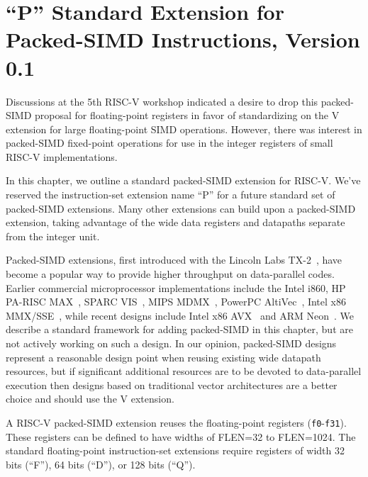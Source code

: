 \chapter{``P'' Standard Extension for Packed-SIMD Instructions,
  Version 0.1}
\label{sec:packedsimd}

\begin{commentary}
  Discussions at the 5th RISC-V workshop indicated a desire to drop
  this packed-SIMD proposal for floating-point registers in favor of
  standardizing on the V extension for large floating-point SIMD
  operations.  However, there was interest in packed-SIMD fixed-point
  operations for use in the integer registers of small RISC-V
  implementations.
\end{commentary}

In this chapter, we outline a standard packed-SIMD extension for
RISC-V.  We've reserved the instruction-set extension name ``P'' for a future
standard set of packed-SIMD extensions.  Many other extensions can
build upon a packed-SIMD extension, taking advantage of the wide data
registers and datapaths separate from the integer unit.

\begin{commentary}
Packed-SIMD extensions, first introduced with the Lincoln Labs TX-2~\cite{tx2},
have become a popular way to provide higher throughput on data-parallel
codes. Earlier commercial microprocessor implementations include the
Intel i860, HP PA-RISC MAX~\cite{lee-max-ieeemicro1996}, SPARC
VIS~\cite{tremblay-vis-ieeemicro1996}, MIPS
MDMX~\cite{gwennap-mdmx-mpr1996}, PowerPC
AltiVec~\cite{diefendorff-altivec-ieeemicro2000}, Intel x86
MMX/SSE~\cite{peleg-mmx-ieeemicro1996, raman-sse-ieeemicro2000}, while
recent designs include Intel x86 AVX~\cite{lomont-avx-irm2011} and ARM
Neon~\cite{goodacre-armisa-computer2005}.  We describe a standard
framework for adding packed-SIMD in this chapter, but are not actively
working on such a design.  In our opinion, packed-SIMD designs represent
a reasonable design point when reusing existing wide datapath resources,
but if significant additional resources are to be devoted to
data-parallel execution then designs based on traditional vector
architectures are a better choice and should use the V extension.

\end{commentary}

A RISC-V packed-SIMD extension reuses the floating-point registers
({\tt f0}-{\tt f31}).  These registers can be defined to have widths
of FLEN=32 to FLEN=1024.  The standard floating-point instruction-set
extensions require registers of width 32 bits (``F''), 64 bits (``D''),
or 128 bits (``Q'').

